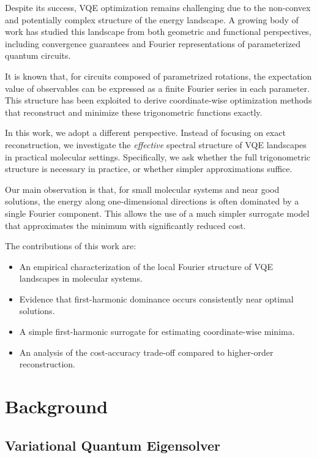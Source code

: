 \documentclass[12pt]{article}
\begin{document}
Despite its success, VQE optimization remains challenging due to the non-convex and potentially complex structure of the energy landscape. A growing body of work has studied this landscape from both geometric and functional perspectives, including convergence guarantees and Fourier representations of parameterized quantum circuits.

It is known that, for circuits composed of parametrized rotations, the expectation value of observables can be expressed as a finite Fourier series in each parameter. This structure has been exploited to derive coordinate-wise optimization methods that reconstruct and minimize these trigonometric functions exactly.

In this work, we adopt a different perspective. Instead of focusing on exact reconstruction, we investigate the \emph{effective} spectral structure of VQE landscapes in practical molecular settings. Specifically, we ask whether the full trigonometric structure is necessary in practice, or whether simpler approximations suffice.

Our main observation is that, for small molecular systems and near good solutions, the energy along one-dimensional directions is often dominated by a single Fourier component. This allows the use of a much simpler surrogate model that approximates the minimum with significantly reduced cost.

The contributions of this work are:
\begin{itemize}
    \item An empirical characterization of the local Fourier structure of VQE landscapes in molecular systems.
    \item Evidence that first-harmonic dominance occurs consistently near optimal solutions.
    \item A simple first-harmonic surrogate for estimating coordinate-wise minima.
    \item An analysis of the cost-accuracy trade-off compared to higher-order reconstruction.
\end{itemize}

\section{Background}

\subsection{Variational Quantum Eigensolver}
\end{document}
